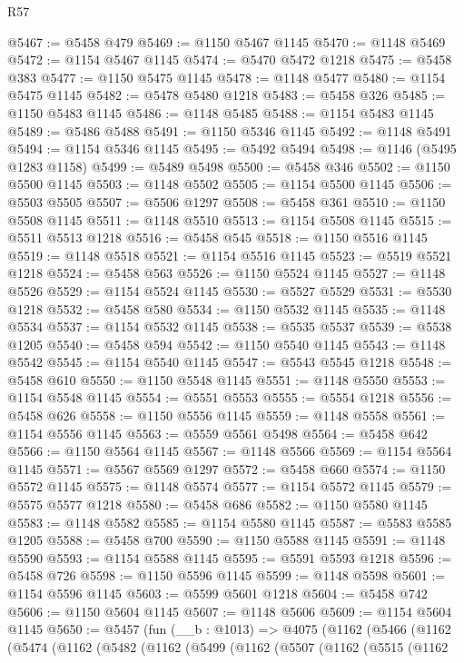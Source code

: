 \begin{lexlean}{R57}
\begin{coremodule}
@5467 := @5458 @479
@5469 := @1150 @5467 @1145
@5470 := @1148 @5469
@5472 := @1154 @5467 @1145
@5474 := @5470 @5472 @1218
@5475 := @5458 @383
@5477 := @1150 @5475 @1145
@5478 := @1148 @5477
@5480 := @1154 @5475 @1145
@5482 := @5478 @5480 @1218
@5483 := @5458 @326
@5485 := @1150 @5483 @1145
@5486 := @1148 @5485
@5488 := @1154 @5483 @1145
@5489 := @5486 @5488
@5491 := @1150 @5346 @1145
@5492 := @1148 @5491
@5494 := @1154 @5346 @1145
@5495 := @5492 @5494
@5498 := @1146 (@5495 @1283 @1158)
@5499 := @5489 @5498
@5500 := @5458 @346
@5502 := @1150 @5500 @1145
@5503 := @1148 @5502
@5505 := @1154 @5500 @1145
@5506 := @5503 @5505
@5507 := @5506 @1297
@5508 := @5458 @361
@5510 := @1150 @5508 @1145
@5511 := @1148 @5510
@5513 := @1154 @5508 @1145
@5515 := @5511 @5513 @1218
@5516 := @5458 @545
@5518 := @1150 @5516 @1145
@5519 := @1148 @5518
@5521 := @1154 @5516 @1145
@5523 := @5519 @5521 @1218
@5524 := @5458 @563
@5526 := @1150 @5524 @1145
@5527 := @1148 @5526
@5529 := @1154 @5524 @1145
@5530 := @5527 @5529
@5531 := @5530 @1218
@5532 := @5458 @580
@5534 := @1150 @5532 @1145
@5535 := @1148 @5534
@5537 := @1154 @5532 @1145
@5538 := @5535 @5537
@5539 := @5538 @1205
@5540 := @5458 @594
@5542 := @1150 @5540 @1145
@5543 := @1148 @5542
@5545 := @1154 @5540 @1145
@5547 := @5543 @5545 @1218
@5548 := @5458 @610
@5550 := @1150 @5548 @1145
@5551 := @1148 @5550
@5553 := @1154 @5548 @1145
@5554 := @5551 @5553
@5555 := @5554 @1218
@5556 := @5458 @626
@5558 := @1150 @5556 @1145
@5559 := @1148 @5558
@5561 := @1154 @5556 @1145
@5563 := @5559 @5561 @5498
@5564 := @5458 @642
@5566 := @1150 @5564 @1145
@5567 := @1148 @5566
@5569 := @1154 @5564 @1145
@5571 := @5567 @5569 @1297
@5572 := @5458 @660
@5574 := @1150 @5572 @1145
@5575 := @1148 @5574
@5577 := @1154 @5572 @1145
@5579 := @5575 @5577 @1218
@5580 := @5458 @686
@5582 := @1150 @5580 @1145
@5583 := @1148 @5582
@5585 := @1154 @5580 @1145
@5587 := @5583 @5585 @1205
@5588 := @5458 @700
@5590 := @1150 @5588 @1145
@5591 := @1148 @5590
@5593 := @1154 @5588 @1145
@5595 := @5591 @5593 @1218
@5596 := @5458 @726
@5598 := @1150 @5596 @1145
@5599 := @1148 @5598
@5601 := @1154 @5596 @1145
@5603 := @5599 @5601 @1218
@5604 := @5458 @742
@5606 := @1150 @5604 @1145
@5607 := @1148 @5606
@5609 := @1154 @5604 @1145
@5650 := @5457
    (fun (__b : @1013) =>
    @4075
      (@1162
        (@5466
          (@1162
            (@5474
              (@1162
                (@5482
                  (@1162
                    (@5499
                      (@1162
                        (@5507
                          (@1162
                            (@5515
                              (@1162

\end{coremodule}
\end{lexlean}
